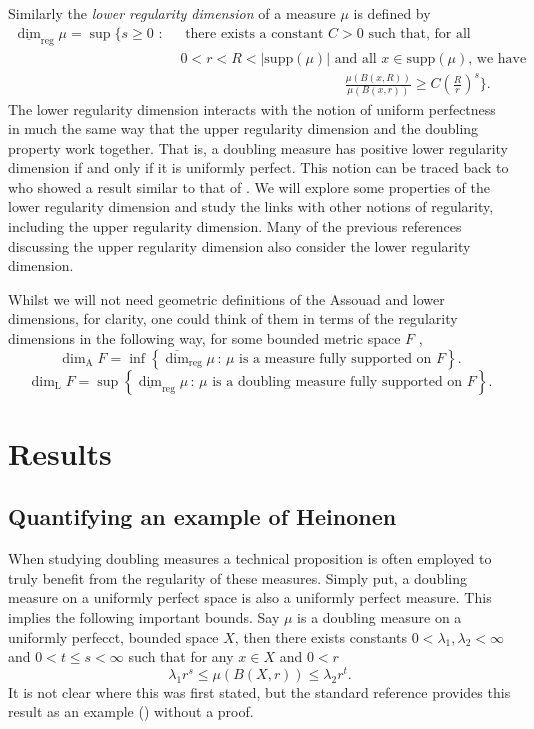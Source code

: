 Similarly the \textit{lower regularity dimension} of a measure $\mu$ is defined by 
\begin{align*} 
\underline{\dim}_{\text{reg}} \mu = \sup \Bigg\{ s \geq 0 \, \,  : \,  &\,\text{ there exists a  constant }C  > 0\text{  such that, for all }  \\ & \, 0< r< R < \lvert \text{supp}(\mu)    \rvert \text{  and all $x \in \text{supp} (\mu)$, we have }  \\  & \hspace{5cm} \frac{\mu(B(x,R))}{\mu(B(x,r))} \geq C\left(\frac{R}{r}\right)^{s} \Bigg\}.
\end{align*}
The lower regularity dimension interacts with the notion of uniform perfectness in much the same way that the upper regularity dimension and the doubling property work together. That is, a doubling measure has positive lower regularity dimension if and only if it is uniformly perfect. This notion can be traced back to \cite{bylund} who showed a result similar to that of \cite{konyagin, luksak}. We will explore some properties of the lower regularity dimension and study the links with other notions of regularity, including the upper regularity dimension. Many of the previous references discussing the upper regularity dimension also consider the lower regularity dimension.

Whilst we will not need geometric definitions of the Assouad and lower dimensions, for clarity, one could think of them in terms of the regularity dimensions in the following way, for some bounded metric space $F$ ,
\[
\dim_{\text{A}} F = \inf \left\{ \overline{\dim}_{\text{reg}} \mu \,  \colon \, \mu \text{ is a measure fully supported on } F\right\}.
\]
\[
\dim_{\text{L}} F = \sup \left\{ \underline{\dim}_{\text{reg}} \mu \,  \colon \, \mu \text{ is a doubling measure fully supported on } F\right\}.
\]




\section{Results}

\subsection{Quantifying an example of Heinonen}


When studying doubling measures a technical proposition is often employed to truly benefit from the regularity of these measures. Simply put, a doubling measure on a uniformly perfect space is also a uniformly perfect measure. This implies the following important bounds. Say $\mu$ is a doubling measure on a uniformly perfecct, bounded space $X$, then there exists constants $0< \lambda_1, \lambda_2 < \infty$ and $0 < t \le s < \infty$ such that for any $x \in X$ and $0 < r$
\[
\lambda_1 r^s \le \mu(B(X,r)) \le \lambda_2 r^t.
\]
It is not clear where this was first stated, but the standard reference \cite{heinonen} provides this result as an example (\cite[Exercise 13.1]{heinonen}) without a proof. 

